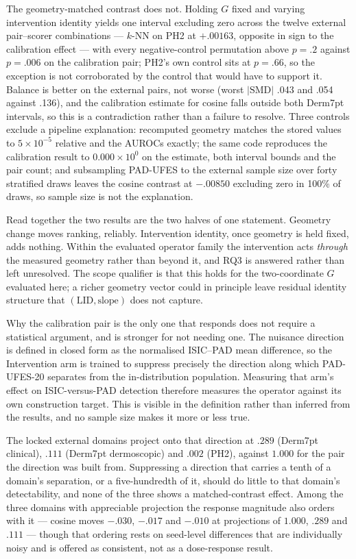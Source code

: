 \documentclass[pdflatex,sn-basic]{sn-jnl}
\theoremstyle{plain}
\theoremstyle{definition}
\theoremstyle{remark}
\begin{document}
The geometry-matched contrast does not. Holding $G$ fixed and varying intervention identity yields one interval excluding zero across the twelve external pair--scorer combinations --- $k$-NN on PH2 at $+.00163$, opposite in sign to the calibration effect --- with every negative-control permutation above $p=.2$ against $p=.006$ on the calibration pair; PH2's own control sits at $p=.66$, so the exception is not corroborated by the control that would have to support it. Balance is better on the external pairs, not worse (worst $|\mathrm{SMD}|$ .043 and .054 against .136), and the calibration estimate for cosine falls outside both Derm7pt intervals, so this is a contradiction rather than a failure to resolve. Three controls exclude a pipeline explanation: recomputed geometry matches the stored values to $5\times10^{-5}$ relative and the AUROCs exactly; the same code reproduces the calibration result to $0.000\times10^{0}$ on the estimate, both interval bounds and the pair count; and subsampling PAD-UFES to the external sample size over forty stratified draws leaves the cosine contrast at $-.00850$ excluding zero in 100\% of draws, so sample size is not the explanation.

Read together the two results are the two halves of one statement. Geometry change moves ranking, reliably. Intervention identity, once geometry is held fixed, adds nothing. Within the evaluated operator family the intervention acts \emph{through} the measured geometry rather than beyond it, and RQ3 is answered rather than left unresolved. The scope qualifier is that this holds for the two-coordinate $G$ evaluated here; a richer geometry vector could in principle leave residual identity structure that $(\mathrm{LID},\text{slope})$ does not capture.

Why the calibration pair is the only one that responds does not require a
statistical argument, and is stronger for not needing one. The nuisance
direction is defined in closed form as the normalised ISIC--PAD mean
difference, so the Intervention arm is trained to suppress precisely the
direction along which PAD-UFES-20 separates from the in-distribution
population. Measuring that arm's effect on ISIC-versus-PAD detection therefore
measures the operator against its own construction target. This is visible in
the definition rather than inferred from the results, and no sample size makes
it more or less true.

The locked external domains project onto that direction at $.289$ (Derm7pt
clinical), $.111$ (Derm7pt dermoscopic) and $.002$ (PH2), against $1.000$ for
the pair the direction was built from. Suppressing a direction that carries a
tenth of a domain's separation, or a five-hundredth of it, should do little to
that domain's detectability, and none of the three shows a matched-contrast
effect. Among the three domains with appreciable projection the response
magnitude also orders with it --- cosine moves $-.030$, $-.017$ and $-.010$ at
projections of $1.000$, $.289$ and $.111$ --- though that ordering rests on
seed-level differences that are individually noisy and is offered as
consistent, not as a dose-response result.
\end{document}
